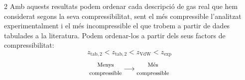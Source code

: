 \documentclass[12pt,twosides,onecolumn,openany]{article}
\begin{document}
\begin{multicols}{2}
Amb aquests resultats podem ordenar cada descripció de gas real que hem considerat segons la seva compressibilitat, sent el més compressible l'analitzat experimentalment i el més incompressible el que trobem a partir de dades tabulades a la literatura. Podem ordenar-los a partir dels seus factors de compressibilitat:
\begin{equation*}
  z_{\text{tab},2} < z_{\text{tab},2} < z_{\text{VdW}} < z_{\text{exp}}
\end{equation*}
\begin{equation*}
  \begin{matrix} \text{\footnotesize Menys} \\ \text{\footnotesize compressible} \end{matrix}\longrightarrow \begin{matrix} \text{\footnotesize Més} \\ \text{\footnotesize compressible} \end{matrix}
\end{equation*}

\end{multicols}
\end{document}
